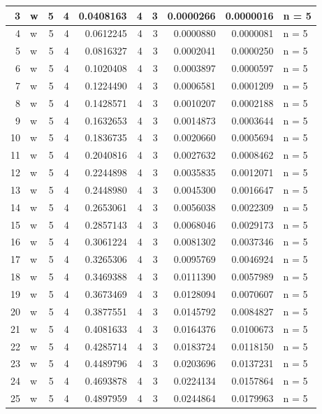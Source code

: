 \documentclass[
  letterpaper,
  DIV=11,
  numbers=noendperiod]{scrreprt}
\begin{document}
\begin{table}
\begin{tabular}[t]{r|l|r|r|r|r|r|r|r|l}
\hline
3 & w & 5 & 4 & 0.0408163 & 4 & 3 & 0.0000266 & 0.0000016 & n = 5\\
\hline
4 & w & 5 & 4 & 0.0612245 & 4 & 3 & 0.0000880 & 0.0000081 & n = 5\\
\hline
5 & w & 5 & 4 & 0.0816327 & 4 & 3 & 0.0002041 & 0.0000250 & n = 5\\
\hline
6 & w & 5 & 4 & 0.1020408 & 4 & 3 & 0.0003897 & 0.0000597 & n = 5\\
\hline
7 & w & 5 & 4 & 0.1224490 & 4 & 3 & 0.0006581 & 0.0001209 & n = 5\\
\hline
8 & w & 5 & 4 & 0.1428571 & 4 & 3 & 0.0010207 & 0.0002188 & n = 5\\
\hline
9 & w & 5 & 4 & 0.1632653 & 4 & 3 & 0.0014873 & 0.0003644 & n = 5\\
\hline
10 & w & 5 & 4 & 0.1836735 & 4 & 3 & 0.0020660 & 0.0005694 & n = 5\\
\hline
11 & w & 5 & 4 & 0.2040816 & 4 & 3 & 0.0027632 & 0.0008462 & n = 5\\
\hline
12 & w & 5 & 4 & 0.2244898 & 4 & 3 & 0.0035835 & 0.0012071 & n = 5\\
\hline
13 & w & 5 & 4 & 0.2448980 & 4 & 3 & 0.0045300 & 0.0016647 & n = 5\\
\hline
14 & w & 5 & 4 & 0.2653061 & 4 & 3 & 0.0056038 & 0.0022309 & n = 5\\
\hline
15 & w & 5 & 4 & 0.2857143 & 4 & 3 & 0.0068046 & 0.0029173 & n = 5\\
\hline
16 & w & 5 & 4 & 0.3061224 & 4 & 3 & 0.0081302 & 0.0037346 & n = 5\\
\hline
17 & w & 5 & 4 & 0.3265306 & 4 & 3 & 0.0095769 & 0.0046924 & n = 5\\
\hline
18 & w & 5 & 4 & 0.3469388 & 4 & 3 & 0.0111390 & 0.0057989 & n = 5\\
\hline
19 & w & 5 & 4 & 0.3673469 & 4 & 3 & 0.0128094 & 0.0070607 & n = 5\\
\hline
20 & w & 5 & 4 & 0.3877551 & 4 & 3 & 0.0145792 & 0.0084827 & n = 5\\
\hline
21 & w & 5 & 4 & 0.4081633 & 4 & 3 & 0.0164376 & 0.0100673 & n = 5\\
\hline
22 & w & 5 & 4 & 0.4285714 & 4 & 3 & 0.0183724 & 0.0118150 & n = 5\\
\hline
23 & w & 5 & 4 & 0.4489796 & 4 & 3 & 0.0203696 & 0.0137231 & n = 5\\
\hline
24 & w & 5 & 4 & 0.4693878 & 4 & 3 & 0.0224134 & 0.0157864 & n = 5\\
\hline
25 & w & 5 & 4 & 0.4897959 & 4 & 3 & 0.0244864 & 0.0179963 & n = 5\\

\end{tabular}
\end{table}
\end{document}
